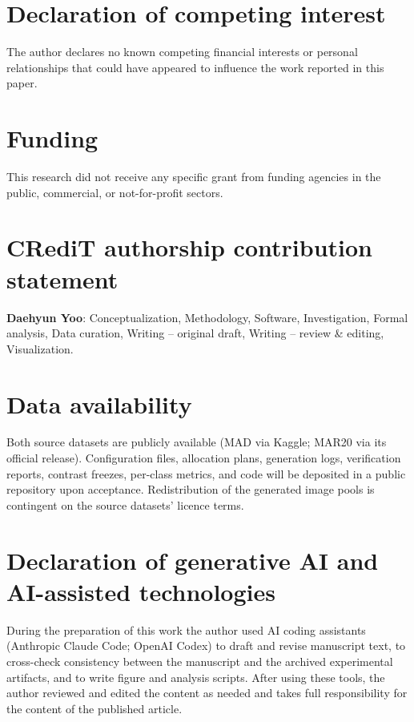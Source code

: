 \documentclass[preprint,12pt,authoryear]{elsarticle}
\begin{document}
\section*{Declaration of competing interest}
The author declares no known competing financial interests or personal
relationships that could have appeared to influence the work reported
in this paper.

\section*{Funding}
This research did not receive any specific grant from funding agencies
in the public, commercial, or not-for-profit sectors.

\section*{CRediT authorship contribution statement}
\textbf{Daehyun Yoo}: Conceptualization, Methodology, Software,
Investigation, Formal analysis, Data curation, Writing -- original
draft, Writing -- review \& editing, Visualization.

\section*{Data availability}
Both source datasets are publicly available (MAD via Kaggle; MAR20 via
its official release). Configuration files, allocation plans,
generation logs, verification reports, contrast freezes, per-class
metrics, and code will be deposited in a public repository upon
acceptance. Redistribution of the generated image pools is contingent
on the source datasets' licence terms.

\section*{Declaration of generative AI and AI-assisted technologies}
During the preparation of this work the author used AI coding
assistants (Anthropic Claude Code; OpenAI Codex) to draft and revise
manuscript text, to cross-check consistency between the manuscript and
the archived experimental artifacts, and to write figure and analysis
scripts. After using these tools, the author reviewed and edited the
content as needed and takes full responsibility for the content of the
published article.





\end{document}
